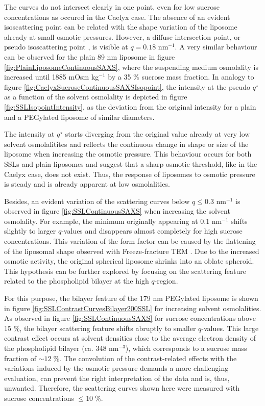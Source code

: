 The curves do not intersect clearly in one point, even for low sucrose concentrations as occured in the Caelyx case. The absence of an evident isoscattering point can be related with the shape variation of the liposome already at small osmotic pressures. However, a diffuse intersection point, or pseudo isoscattering point \citep{kawaguchi_application_2004}, is visible at $q=0.18$ nm$^{-1}$. A very similar behaviour can be observed for the plain 89 nm liposome in figure \ref{fig:PlainLiposomeContinuousSAXS}, where the suspending medium osmolality is increased until 1885 mOsm kg$^{-1}$ by a 35 $\%$ sucrose mass fraction. In analogy to figure \ref{fig:CaelyxSucroseContinuousSAXSIsopoint}, the intensity at the pseudo $q^{\star}$ as a function of the solvent osmolality is depicted in figure \ref{fig:SSLIsopointIntensity}, as the deviation from the original intensity for a plain and a PEGylated liposome of similar diameters.

The intensity at $q^{\star}$ starts diverging from the original value already at very low solvent osmolalitites and reflects the continuous change in shape or size of the liposome when increasing the osmotic pressure. This behaviour occurs for both SSLs and plain liposomes and suggest that a sharp osmotic threshold, like in the Caelyx case, does not exist. Thus, the response of liposomes to osmotic pressure is steady and is already apparent at low osmolalities.

Besides, an evident variation of the scattering curves below $q\leq0.3$ nm$^{-1}$ is observed in figure \ref{fig:SSLContinuousSAXS} when increasing the solvent osmolality. For example, the minimum originally appearing at 0.1 nm$^{-1}$ shifts slightly to larger $q$-values and disappears almost completely for high sucrose concentrations. This variation of the form factor can be caused by the flattening of the liposomal shape observed with Freeze-fracture TEM \citep{varga_osmotic_2014}. Due to the increased osmotic activity, the original spherical liposome shrinks into an oblate spheroid. This hypothesis can be further explored by focusing on the scattering feature related to the phospholipid bilayer at the high $q$-region.

For this purpose, the bilayer feature of the 179 nm PEGylated liposome is shown in figure \ref{fig:SSLContrastCurvesBilayer200SSL} for increasing solvent osmolalities. As observed in figure \ref{fig:SSLContinuousSAXS} for sucrose concentrations above 15 $\%$, the bilayer scattering feature shifts abruptly to smaller $q$-values. This large contrast effect occurs at solvent densities close to the average electron density of the phospholipid bilayer (ca. 348 nm$^{-3}$), which corresponds to a sucrose mass fraction of $\sim 12 \; \%$. The convolution of the contrast-related effects with the variations induced by the osmotic pressure demands a more challenging evaluation, can prevent the right interpretation of the data and is, thus, unwanted. Therefore, the scattering curves shown here were measured with sucrose concentrations $\leq10\;\%$.

